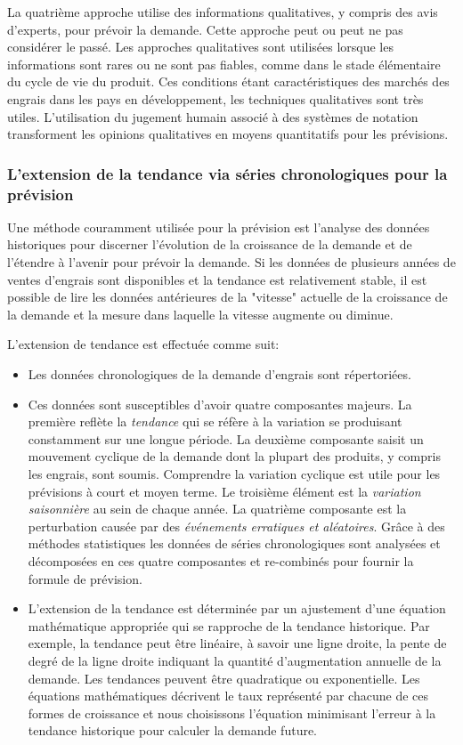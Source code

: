 	La quatrième approche utilise des informations qualitatives, y compris des avis d'experts, pour prévoir la demande. Cette approche peut ou peut ne pas considérer le passé. Les approches qualitatives sont utilisées lorsque les informations sont rares ou ne sont pas fiables, comme dans le stade élémentaire du cycle de vie du produit. Ces conditions étant caractéristiques des marchés des engrais dans les pays en développement, les techniques qualitatives sont très utiles. L'utilisation du jugement humain associé à des systèmes de notation transforment les opinions qualitatives en moyens quantitatifs pour les prévisions.
	\subsubsection{L'extension de la tendance via séries chronologiques pour la prévision}
	Une méthode couramment utilisée pour la prévision est l'analyse des données historiques pour discerner l'évolution de la croissance de la demande et de l'étendre à l'avenir pour prévoir la demande. Si les données de plusieurs années de ventes d'engrais sont disponibles et la tendance est relativement stable, il est possible de lire les données antérieures de la "vitesse" actuelle de la croissance de la demande et la mesure dans laquelle la vitesse augmente ou diminue.\par
	L'extension de tendance est effectuée comme suit:
	\begin{itemize}
	\item Les données chronologiques de la demande d'engrais sont répertoriées.
	\item Ces données sont susceptibles d'avoir quatre composantes majeurs. La première reflète la \textit{tendance} qui se réfère à la variation se produisant constamment sur une longue période. La deuxième composante saisit un mouvement cyclique de la demande dont la plupart des produits, y compris les engrais, sont soumis. Comprendre la variation cyclique est utile pour les prévisions à court et moyen terme. Le troisième élément est la \textit{variation saisonnière} au sein de chaque année. La quatrième composante est la perturbation causée par des \textit{événements erratiques et aléatoires}. Grâce à des méthodes statistiques les données de séries chronologiques sont analysées et décomposées en ces quatre composantes et re-combinés pour fournir la formule de prévision.
	\item L'extension de la tendance est déterminée par un ajustement d'une équation mathématique appropriée qui se rapproche de la tendance historique. Par exemple, la tendance peut être linéaire, à savoir une ligne droite, la pente de degré de la ligne droite indiquant la quantité d'augmentation annuelle de la demande. Les tendances peuvent être quadratique ou exponentielle. Les équations mathématiques décrivent le taux représenté par chacune de ces formes de croissance et nous choisissons l'équation minimisant l'erreur à la tendance historique pour calculer la demande future.
	\end{itemize}
